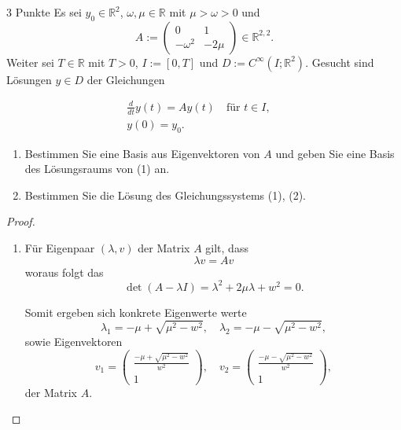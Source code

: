 \documentclass{problemset}
\begin{document}
\begin{problem}{3 Punkte}
Es sei $y_0 \in \mathbb{R}^2$, $\omega, \mu \in \mathbb{R}$ mit $\mu > \omega >
    0$ und
\[ A := \begin{pmatrix} 0 & 1 \\ -\omega^2 & -2\mu \end{pmatrix} \in \mathbb{R}^{2,2}. \]
Weiter sei $T \in \mathbb{R}$ mit $T > 0$, $I := [0, T]$ und $D :=
   C^\infty(I; \mathbb{R}^2)$. Gesucht sind Lösungen $y \in D$ der Gleichungen

\begin{align}
    \frac{d}{dt} y(t) = Ay(t) \quad \text{für } t \in I, \quad \\
    y(0) = y_0. \quad
\end{align}

\begin{enumerate}
    \item Bestimmen Sie eine Basis aus Eigenvektoren von $A$ und geben Sie eine
          Basis des Lösungsraums von (1) an.
    \item Bestimmen Sie die Lösung des Gleichungssystems (1), (2).
\end{enumerate}

\begin{proof}
    \leavevmode

    \begin{enumerate}
        \item Für Eigenpaar \((\lambda, v)\) der Matrix \(A\) gilt, dass
              \begin{equation*}
                  \lambda v = Av
              \end{equation*} woraus folgt das
              \begin{equation*}
                  \det(A - \lambda I) = \lambda^2 + 2\mu\lambda + w^2 = 0.
              \end{equation*}

              Somit ergeben sich konkrete Eigenwerte werte
              \begin{equation*}
                  \lambda_1 =  -\mu + \sqrt{\mu^2 - w^2}, \quad \lambda_2 =  -\mu - \sqrt{\mu^2 - w^2},
              \end{equation*} sowie Eigenvektoren
              \begin{equation*}
                  v_1 = \begin{pmatrix}
                      \frac{-\mu + \sqrt{\mu^2 - w^2}}{w^2} \\ 1
                  \end{pmatrix}, \quad
                  v_2 = \begin{pmatrix}
                      \frac{-\mu - \sqrt{\mu^2 - w^2}}{w^2} \\ 1
                  \end{pmatrix},
              \end{equation*} der Matrix \(A\).


\end{enumerate}
\end{proof}
\end{problem}
\end{document}
